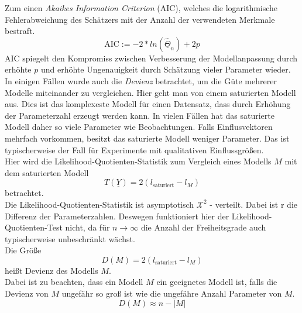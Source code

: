 \noindent
Zum einen \textit{Akaikes Information Criterion} (AIC), welches die logarithmische Fehlerabweichung des Sch\"atzers mit der Anzahl der verwendeten Merkmale bestraft. \\
\begin{equation}
\text{AIC} := -2*ln(\underline{\hat{\Theta}}_n) + 2p
\end{equation}  
AIC spiegelt den Kompromiss zwischen Verbesserung der Modellanpassung durch erhöhte $p$ und erhöhte Ungenauigkeit durch Schätzung vieler Parameter wieder. \\
In einigen F\"allen wurde auch die \textit{Devienz} betrachtet, um die G\"ute mehrerer Modelle miteinander zu vergleichen.
Hier geht man von einem saturierten Modell aus. Dies ist das komplexeste Modell f\"ur einen Datensatz, dass durch Erh\"ohung der Parameterzahl erzeugt werden kann. In vielen F\"allen hat das saturierte Modell daher so viele Parameter wie Beobachtungen. Falls Einflusvektoren mehrfach vorkommen, besitzt das saturierte Modell weniger Parameter. Das ist typischerweise der Fall f\"ur Experimente mit qualitativen Einflussgr\"o\ss{}en. \\
Hier wird die Likelihood-Quotienten-Statistik zum Vergleich eines Modells $M$ mit dem saturierten Modell 
\begin{equation}
T(\underline{Y}) = 2(l_{\text{saturiert}} - l_M)
\end{equation}
betrachtet. \\
Die Likelihood-Quotienten-Statistik ist asymptotisch  $\mathcal{X}^2$ - verteilt. Dabei ist r die Differenz der Parameterzahlen. Deswegen funktioniert hier der Likelihood-Quotienten-Test nicht, da f\"ur $n \rightarrow \infty$ die Anzahl der Freiheitsgrade auch typischerweise unbeschr\"ankt w\"achst. \\
Die Gr\"o\ss{}e 
\begin{equation}
D(M) = 2(l_{\text{saturiert}} - l_M)
\end{equation}
hei\ss{}t Devienz des Modells $M$. \\
Dabei ist zu beachten, dass ein Modell $M$ ein geeignetes Modell ist, falls die Devienz von $M$ ungef\"ahr so gro\ss{} ist wie die ungef\"ahre Anzahl Parameter von $M$. \\
\begin{equation}
D(M) \approx n - |M|
\end{equation}
\par\medskip


